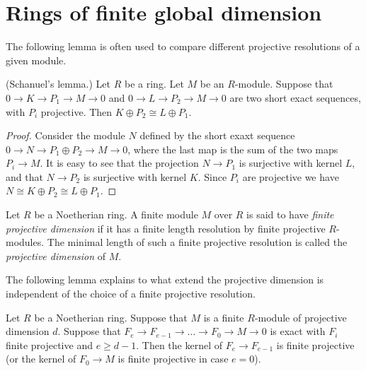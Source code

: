 \section{Rings of finite global dimension}
\label{section-ring-finite-gl-dim}

\noindent
The following lemma is often used to compare different
projective resolutions of a given module.

\begin{lemma}
\label{lemma-Schanuel}
(Schanuel's lemma.)
Let $R$ be a ring. Let $M$ be an $R$-module.
Suppose that $0 \to K \to P_1 \to M \to 0$
and $0 \to L \to P_2 \to M \to 0$ are two short exact
sequences, with $P_i$ projective.
Then $K \oplus P_2 \cong L \oplus P_1$.
\end{lemma}

\begin{proof}
Consider the module
$N$ defined by the short exaxt sequence
$0 \to N \to P_1 \oplus P_2 \to M \to 0$,
where the last map is the sum of the two maps
$P_i \to M$. It is easy to see that the projection
$N \to P_1$ is surjective with kernel $L$, and that
$N \to P_2$ is surjective with kernel $K$.
Since $P_i$ are projective we have $N \cong K \oplus P_2
\cong L \oplus P_1$.
\end{proof}

\begin{definition}
\label{definition-finite-proj-dim}
Let $R$ be a Noetherian ring.
A finite module $M$ over $R$ is said to have {\it finite
projective dimension} if it has a finite length resolution by finite
projective $R$-modules. The minimal length of such a
finite projective resolution is called the {\it projective
dimension} of $M$.
\end{definition}

\noindent
The following lemma explains to what extend the projective
dimension is independent of the choice of a finite projective
resolution.

\begin{lemma}
\label{lemma-independent-resolution}
Let $R$ be a Noetherian ring.
Suppose that $M$ is a finite $R$-module
of projective dimension $d$.
Suppose that $F_e \to F_{e-1} \to \ldots \to F_0 \to M \to 0$
is exact with $F_i$ finite projective and $e \geq d - 1$.
Then the kernel of $F_e \to F_{e-1}$ is finite projective
(or the kernel of $F_0 \to M$ is finite projective in case
$e = 0$).
\end{lemma}

